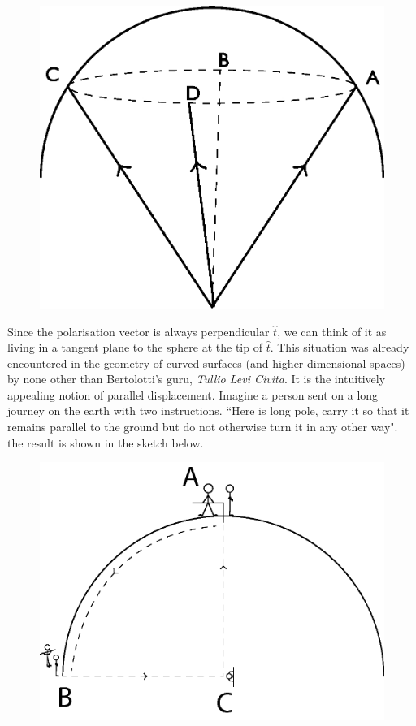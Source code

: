 \begin{figure}[H]
\centering
\includegraphics[scale=0.27]{src/images/chap26/21.jpg}
\end{figure}
\bigskip

Since the polarisation vector is always perpendicular $\hat{t}$, we can think of it as
living in a tangent plane to the sphere at the tip of $\hat{t}$. This situation was already
encountered in the geometry of curved surfaces (and higher dimensional spaces)
by none other than Bertolotti's guru, \textit{Tullio Levi Civita}. It is the intuitively
appealing notion of parallel displacement. Imagine a person sent on a long
journey on the earth with two instructions. ``Here is long pole, carry it so that
it remains parallel to the ground but do not otherwise turn it in any other way".
the result is shown in the sketch below.
\bigskip

\begin{figure}[H]
\centering
\includegraphics[scale=0.34]{src/images/chap26/22.jpg}
\end{figure}
\bigskip

